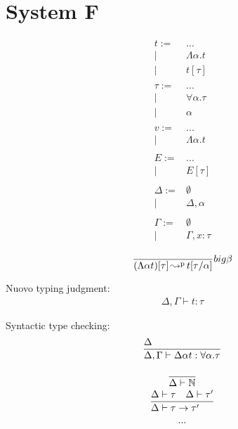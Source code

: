\documentclass{article}
\begin{document}
\section{System F}
\begin{align*}
    t :=& ... \\
    |& \Lambda\alpha.t \\
    |& t[\tau] \\
    \\
    \tau :=& ... \\
    |& \forall \alpha.\tau \\
    |& \alpha \\
    \\
    v :=& ... \\
    |& \Lambda\alpha.t \\
    \\
    E :=& ... \\
    |& E[\tau] \\
    \\
    \Delta :=& \emptyset \\
    |& \Delta,\alpha \\
    \\
    \Gamma :=& \emptyset \\
    |& \Gamma,x:\tau
\end{align*}

\begin{align*}
    \st[$big\beta$]{(\Lambda\alpha t)[\tau] \credp t[\tau/\alpha]}{}
\end{align*}

Nuovo typing judgment:
\begin{align*}
    \Delta,\Gamma\vdash t:\tau
\end{align*}

Syntactic type checking:
\begin{align*}
    \st{\Delta,\Gamma\vdash \Delta\alpha t:\forall\alpha.\tau}{\Delta}
\end{align*}

\begin{gather*}
    \st{\Delta\vdash\N}{} \\
    \st{\Delta\vdash\tau\to\tau'}{\Delta\vdash\tau\quad \Delta\vdash\tau'} \\
    ...
\end{gather*}

\end{document}

